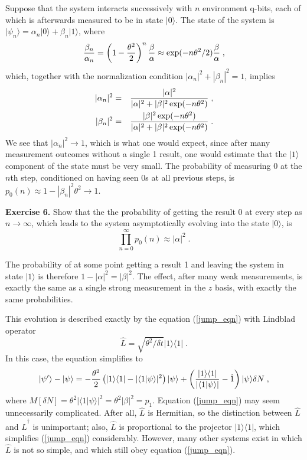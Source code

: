 \documentclass[12pt]{article}
\def\bra#1{{\langle #1 |}}
\def\ket#1{{| #1 \rangle}}
\def\bracket#1#2{{\langle #1 | #2 \rangle}}
\def\id{{\hat 1}}
\def\L{{\hat L}}
\def\Ldag{{\hat L^\dagger}}
\begin{document}
Suppose that the system interacts successively with $n$ environment
q-bits, each of which is afterwards measured to be in state $\ket0$.
The state of the system is $\ket{\psi_n} = \alpha_n\ket0 + \beta_n\ket1$,
where
\begin{equation}
{\beta_n\over\alpha_n} =
  \left( 1 - {\theta^2\over2} \right)^n
  {\beta\over\alpha} \approx
  \exp( - n\theta^2/2) {\beta\over\alpha} \;,
\end{equation}
which, together with the normalization condition
$|\alpha_n|^2+|\beta_n|^2=1$, implies
\begin{eqnarray}
|\alpha_n|^2
  &=& {|\alpha|^2\over |\alpha|^2
 + |\beta|^2\exp(-n\theta^2) } \;, \nonumber\\
|\beta_n|^2
  &=& {|\beta|^2\exp(-n\theta^2)\over |\alpha|^2
 + |\beta|^2\exp(-n\theta^2) } \;.
\label{asymptotic_jump}
\end{eqnarray}
We see that $|\alpha_n|^2 \rightarrow 1$, which is what one would expect,
since after many measurement outcomes without a single 1 result, one would
estimate that the $\ket1$ component of the state must be very small.
The probability of measuring 0 at the $n$th step, conditioned on having
seen 0s at all previous steps,
is $p_0(n) \approx 1 - |\beta_n|^2\theta^2 \rightarrow 1$.

\medskip\noindent
{\bf Exercise 6.} Show that the the probability of getting the result 0 at
every step as $n\rightarrow\infty$, which leads to the system asymptotically
evolving into the state $\ket0$, is
\begin{equation}
\prod_{n=0}^\infty p_0(n) \approx |\alpha|^2 \;.
\end{equation}
\medskip

The probability of at some point getting a result 1 and leaving the
system in state $\ket1$ is therefore $1-|\alpha|^2 = |\beta|^2$.
The effect, after many weak measurements, is exactly the same as a single
strong measurement in the $z$ basis, with exactly the same probabilities.

This evolution is described exactly by the equation (\ref{jump_eqn})
with Lindblad operator
\begin{equation}
\L = \sqrt{\theta^2/\delta t} \ket1\bra1 \;.
\label{CNOTlindblad}
\end{equation}
In this case, the equation simplifies to
\begin{equation}
\ket{\psi'}-\ket\psi = -{\theta^2\over2}
  \left( \ket1\bra1 - |\bracket{1}{\psi}|^2 \right) \ket\psi
  + \left( {\ket1\bra1\over|\bracket{1}{\psi}|}
  - \id \right)\ket\psi \delta N \;,
\end{equation}
where $M[\delta N] = \theta^2 |\bracket{1}{\psi}|^2 = \theta^2|\beta|^2 = p_1$.
Equation (\ref{jump_eqn}) may seem unnecessarily
complicated.  After all, $\L$ is Hermitian, so the distinction between
$\L$ and $\Ldag$ is unimportant; also, $\L$ is proportional to the
projector $\ket1\bra1$, which simplifies (\ref{jump_eqn}) considerably.
However, many other systems exist in which $\L$ is not so simple, and
which still obey equation (\ref{jump_eqn}).
\end{document}
